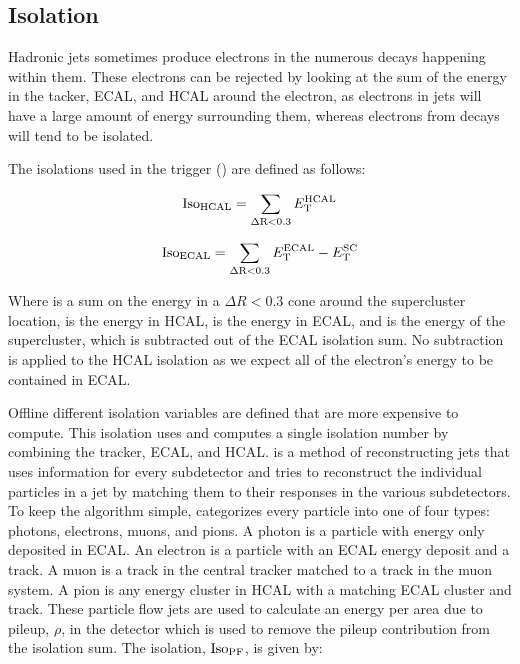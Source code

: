 \subsection{Isolation}

Hadronic jets sometimes produce electrons in the numerous decays happening
within them. These electrons can be rejected by looking at the sum of the
energy in the tacker, ECAL, and HCAL around the electron, as electrons in jets
will have a large amount of energy surrounding them, whereas electrons from \Z
decays will tend to be isolated.

The isolations used in the trigger (\SingleElectronTrigger) are defined as
follows:

\begin{equation}
    \text{Iso}_{\text{HCAL}} = \sum_{\Delta \text{R}<0.3} E_{\mathrm{T}}^{\text{HCAL}}
\end{equation}

\begin{equation}
    \text{Iso}_{\text{ECAL}} = \sum_{\Delta \text{R}<0.3} E_{\mathrm{T}}^{\text{ECAL}} - E_{\mathrm{T}}^{\text{SC}}
\end{equation}

Where \DeltaRSum is a sum on the energy in a $\Delta R < 0.3$ cone around the
supercluster location, \ETHCAL is the energy in HCAL, \ETECAL is the energy in
ECAL, and \ETSC is the energy of the supercluster, which is subtracted out of
the ECAL isolation sum. No subtraction is applied to the HCAL isolation as we
expect all of the electron's energy to be contained in ECAL.

Offline different isolation variables are defined that are more expensive to
compute. This isolation uses \particleflow\cite{particle_flow_2010} and
computes a single isolation number by combining the tracker, ECAL, and HCAL.
\ParticleFlow is a method of reconstructing jets that uses information for
every subdetector and tries to reconstruct the individual particles in a jet by
matching them to their responses in the various subdetectors. To keep the
algorithm simple, \particleflow categorizes every particle into one of four
types: photons, electrons, muons, and pions. A photon is a particle with energy
only deposited in ECAL. An electron is a particle with an ECAL energy deposit
and a track. A muon is a track in the central tracker matched to a track in the
muon system. A pion is any energy cluster in HCAL with a matching ECAL cluster
and track. These particle flow jets are used to calculate an energy per area
due to pileup, $\rho$, in the detector which is used to remove the pileup
contribution from the isolation sum. The \particleflow isolation, $\text{Iso}_{\text{PF}}$, is
given by:


